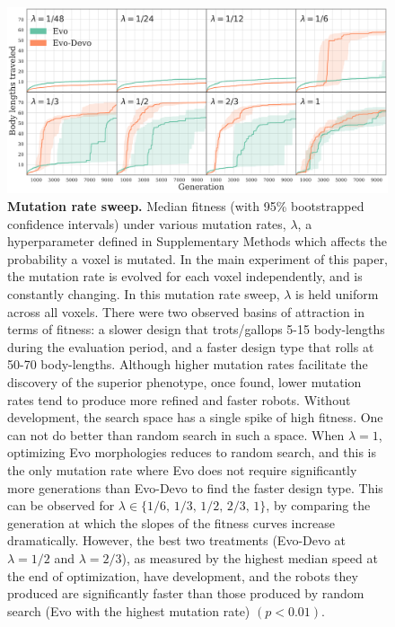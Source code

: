 \begin{figure}
\centering
\includegraphics[width=\linewidth]{Chapter04/FigS3}
\caption{\label{fig:S3}\textbf{Mutation rate sweep.} 
Median fitness (with 95\% bootstrapped confidence intervals) under various mutation rates, $\lambda$, a hyperparameter defined in Supplementary Methods which affects the probability a voxel is mutated. 
In the main experiment of this paper, the mutation rate is evolved for each voxel independently, and is constantly changing.
In this mutation rate sweep, $\lambda$ is held uniform across all voxels.
There were two observed basins of attraction in terms of fitness: a slower design that trots/gallops 5-15 body-lengths during the evaluation period, and a faster design type that rolls at 50-70 body-lengths. 
Although higher mutation rates facilitate the discovery of the superior phenotype, once found, lower mutation rates tend to produce more refined and faster robots.
Without development, the search space has a single spike of high fitness. 
One can not do better than random search in such a space.
When $\lambda=1$, optimizing Evo morphologies reduces to random search, and this is the only mutation rate where Evo does not require significantly more generations than Evo-Devo to find the faster design type.
This can be observed for $\lambda\in\{1/6,\, 1/3,\, 1/2,\, 2/3,\, 1\}$, by comparing the generation at which the slopes of the fitness curves increase dramatically.
However, the best two treatments (Evo-Devo at $\lambda=1/2$ and $\lambda=2/3$), as measured by the highest median speed at the end of optimization, have development, and the robots they produced are significantly faster than those produced by random search (Evo with the highest mutation rate)
$(p<0.01)$.
}
\end{figure}



